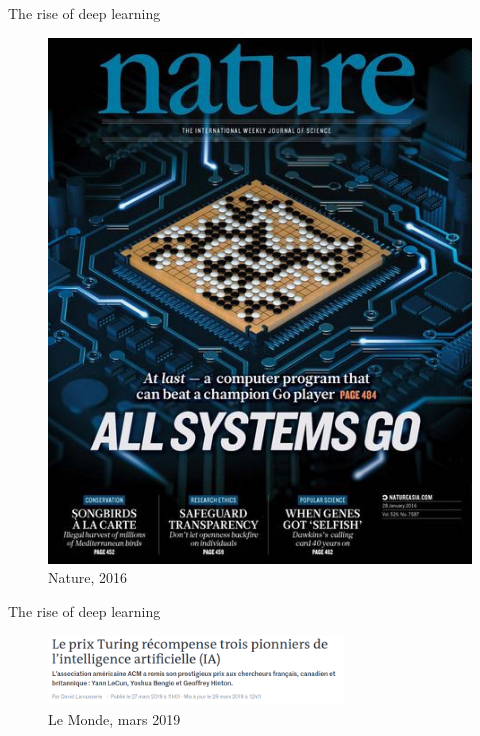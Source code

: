 \documentclass[xcolor=pdftex,dvipsnames,table,mathserif]{beamer}
\begin{document}
\begin{frame}{The rise of deep learning}

\begin{figure}[ht]
  \centering
  \includegraphics[height=0.5\textheight]{nature_go}
  \caption*{Nature, 2016}
\end{figure}


\end{frame}


\begin{frame}{The rise of deep learning}

\begin{figure}[ht]
  \centering
  \includegraphics[width=0.7\textwidth]{lemonde27mars2019}
  \caption*{Le Monde, mars 2019}
\end{figure}


\end{frame}
\end{document}

